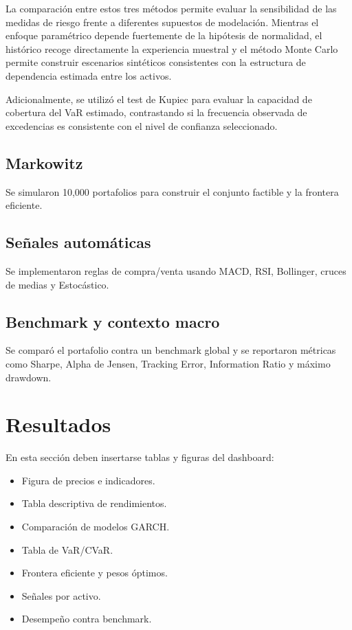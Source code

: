 \documentclass[11pt]{article}
\begin{document}
La comparación entre estos tres métodos permite evaluar la sensibilidad de las medidas de riesgo frente a diferentes supuestos de modelación. Mientras el enfoque paramétrico depende fuertemente de la hipótesis de normalidad, el histórico recoge directamente la experiencia muestral y el método Monte Carlo permite construir escenarios sintéticos consistentes con la estructura de dependencia estimada entre los activos.

Adicionalmente, se utilizó el test de Kupiec para evaluar la capacidad de cobertura del VaR estimado, contrastando si la frecuencia observada de excedencias es consistente con el nivel de confianza seleccionado.

\subsection{Markowitz}
Se simularon 10{,}000 portafolios para construir el conjunto factible y la frontera eficiente.

\subsection{Señales automáticas}
Se implementaron reglas de compra/venta usando MACD, RSI, Bollinger, cruces de medias y Estocástico.

\subsection{Benchmark y contexto macro}
Se comparó el portafolio contra un benchmark global y se reportaron métricas como Sharpe, Alpha de Jensen, Tracking Error, Information Ratio y máximo drawdown.

\section{Resultados}
En esta sección deben insertarse tablas y figuras del dashboard:
\begin{itemize}
    \item Figura de precios e indicadores.
    \item Tabla descriptiva de rendimientos.
    \item Comparación de modelos GARCH.
    \item Tabla de VaR/CVaR.
    \item Frontera eficiente y pesos óptimos.
    \item Señales por activo.
    \item Desempeño contra benchmark.
\end{itemize}
\end{document}
